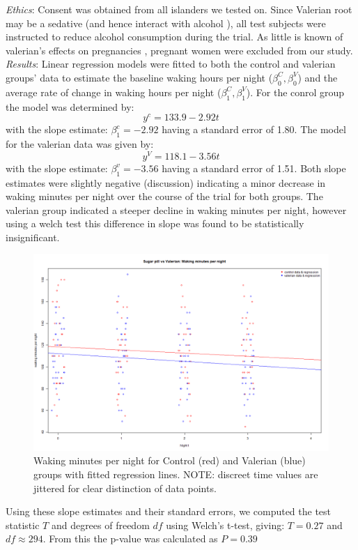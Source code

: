 \documentclass[10pt,preprintnumbers,amsmath,amssymb,floatfix,twocolumn,prl]{revtex4-2}
\begin{document}
\textit{Ethics}: Consent was obtained from all islanders we tested on. Since Valerian root may be a sedative (and hence interact with alcohol \cite{ValerianSource1}), all test subjects were instructed to reduce alcohol consumption during the trial. As little is known of valerian's effects on pregnancies \cite{ValerianSource2}, pregnant women were excluded from our study. \\

\textit{Results}: Linear regression models were fitted to both the control and valerian groups' data to estimate the baseline waking hours per night ($\beta_0^C, \beta_0^V$) and the average rate of change in waking hours per night ($\beta_1^C, \beta_1^V$). For the conrol group the model was determined by:
$$
y^c = 133.9 - 2.92 t
$$
with the slope estimate: $\beta_1^c = - 2.92$ having a standard error of 1.80.
The model for the valerian data was given by: 
$$
y^V = 118.1 - 3.56 t
$$
with the slope estimate: $\beta_1^v = - 3.56$ having a standard error of 1.51.
Both slope estimates were slightly negative (discussion) indicating a minor decrease in waking minutes per night over the course of the trial for both groups. The valerian group indicated a steeper decline in waking minutes per night, however using a welch test this difference in slope was found to be statistically insignificant. 
\begin{figure}[H]
\centering
\includegraphics[width=0.95\linewidth]{linear_reg.png}
\caption{Waking minutes per night for Control (red) and Valerian (blue) groups with fitted regression lines. NOTE: discreet time values are jittered for clear distinction of data points.}
\end{figure}
Using these slope estimates and their standard errors, we computed the test statistic $T$ and degrees of freedom $df$ using Welch's t-test, giving: $T = 0.27$ and $df \approx 294$. From this the p-value was calculated as $P = 0.39$
\end{document}
